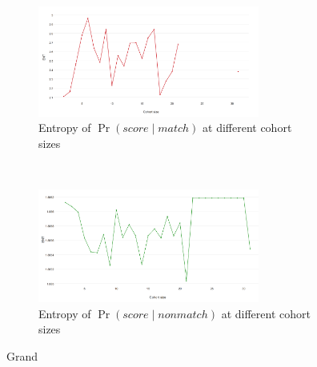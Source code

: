 \begin{figure}[htbp]
    \centering
    \begin{subfigure}[t]{\textwidth}
        \centering
        \includegraphics[width=0.8\textwidth]{dataset/grand/ent_psm}
        \caption{Entropy of $\Pr{(score \mid match)}$ at different cohort sizes}
        \label{fig:grand_ent_psm} %
    \end{subfigure}%
    \\
    \begin{subfigure}[t]{\textwidth}
        \centering
        \includegraphics[width=0.8\textwidth]{dataset/grand/ent_psnm}
        \caption{Entropy of $\Pr{(score \mid nonmatch)}$ at different cohort sizes}
        \label{fig:grand_ent_psnm} %
    \end{subfigure}%
    \caption{Grand}
    \label{fig:grand_entemd} %
\end{figure}

